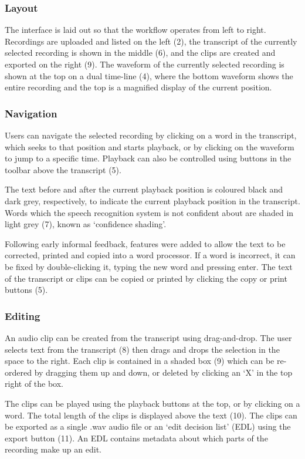 \subsubsection{Layout}
The interface is laid out so that the workflow operates from left to right.
Recordings are uploaded and listed on the left (2), the transcript of the
currently selected recording is shown in the middle (6), and the clips are
created and exported on the right (9). The waveform of the currently selected
recording is shown at the top on a dual time-line (4), where the bottom
waveform shows the entire recording and the top is a magnified display of the
current position.

\subsubsection{Navigation}
Users can navigate the selected recording by clicking on a word in the
transcript, which seeks to that position and starts playback, or by clicking on
the waveform to jump to a specific time. Playback can also be controlled using
buttons in the toolbar above the transcript (5).

The text before and after the current playback position is coloured black and
dark grey, respectively, to indicate the current playback position in the
transcript.  Words which the speech recognition system is not confident about
are shaded in light grey (7), known as `confidence shading'.

Following early informal feedback, features were added to allow the text to be
corrected, printed and copied into a word processor. If a word is
incorrect, it can be fixed by double-clicking it, typing the new word and
pressing enter. The text of the transcript or clips can be copied or printed by
clicking the copy or print buttons (5).

\subsubsection{Editing}
An audio clip can be created from the transcript using drag-and-drop.  The user
selects text from the transcript (8) then drags and drops the selection in the
space to the right.  Each clip is contained in a shaded box (9) which can be
re-ordered by dragging them up and down, or deleted by clicking an `X' in the
top right of the box.

The clips can be played using the playback buttons at the top, or by clicking
on a word. The total length of the clips is displayed above the text (10).  The
clips can be exported as a single .wav audio file or an `edit decision list'
(EDL) using the export button (11). An EDL contains metadata about which parts
of the recording make up an edit.


